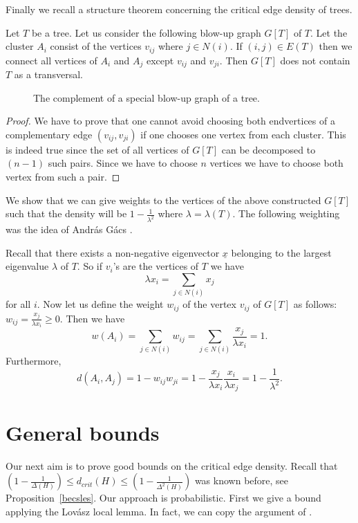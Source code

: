 \documentclass[12pt,a4paper]{amsart}
\numberwithin{equation}{section}
\begin{document}
Finally we recall a structure theorem concerning the critical
edge density of trees.  

\begin{prop} {\rm \cite{nagy1}} Let $T$ be a tree. Let us consider the following
  blow-up graph $G[T]$ of $T$. Let the cluster $A_i$ consist of the vertices
  $v_{ij}$ where $j\in N(i)$. If $(i,j)\in E(T)$ then we connect all vertices
  of $A_i$ and $A_j$ except $v_{ij}$ and $v_{ji}$. Then $G[T]$ does not
  contain $T$ as a transversal. 
\end{prop} 

\begin{figure}[h!]
\begin{center}
   \caption{The complement of
  a special blow-up graph of a tree.} 
\end{center}
\end{figure} 
   

\begin{proof} We have to prove that one cannot avoid choosing both endvertices
  of a complementary edge $(v_{ij},v_{ji})$ if one chooses one vertex from
  each cluster. This is indeed true since the set of all vertices of $G[T]$
  can be decomposed to  $(n-1)$ such pairs. Since we have to choose $n$
  vertices we have to choose both vertex from such a pair.
\end{proof}

We show that we can give weights to the vertices of the above constructed
$G[T]$ such that the density will be $1-\frac{1}{\lambda^2}$ where
$\lambda=\lambda(T)$. The following weighting was the idea of Andr\'as G\'acs
\cite{gacs}. 

Recall that there exists a non-negative eigenvector $\underline{x}$ belonging to
the largest eigenvalue $\lambda$ of $T$. So if $v_i$'s are the vertices of $T$
we have 
$$\lambda x_i=\sum_{j\in N(i)}x_j$$
for all $i$. 
Now let us define the weight $w_{ij}$ of the vertex $v_{ij}$ of $G[T]$ as
follows: $w_{ij}=\frac{x_j}{\lambda x_i}\geq 0$. Then we have
$$w(A_i)=\sum_{j\in N(i)}w_{ij}= \sum_{j\in N(i)}\frac{x_j}{\lambda x_i}=1.$$
Furthermore,
$$d(A_i,A_j)=1-w_{ij}w_{ji}=1-\frac{x_j}{\lambda x_i}\frac{x_i}{\lambda
  x_j}=1-\frac{1}{\lambda^2}.$$

\section{General bounds } 

Our next aim is to prove good bounds on the critical edge density. Recall that
$(1-\frac{1}{\Delta(H)})\leq d_{crit}(H)\leq (1-\frac{1}{\Delta^2(H)})$ was
known before, see Proposition~\ref{becsles}. 
Our approach is probabilistic. First we give a bound applying the Lov\'asz
local lemma. In fact, we can copy the argument of \cite{alon}. 
\end{document}
